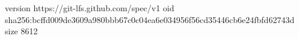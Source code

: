 version https://git-lfs.github.com/spec/v1
oid sha256:bcffd009de3609a980bbb67c0c04ea6e034956f56cd35446cb6e24fbfd62743d
size 8612
